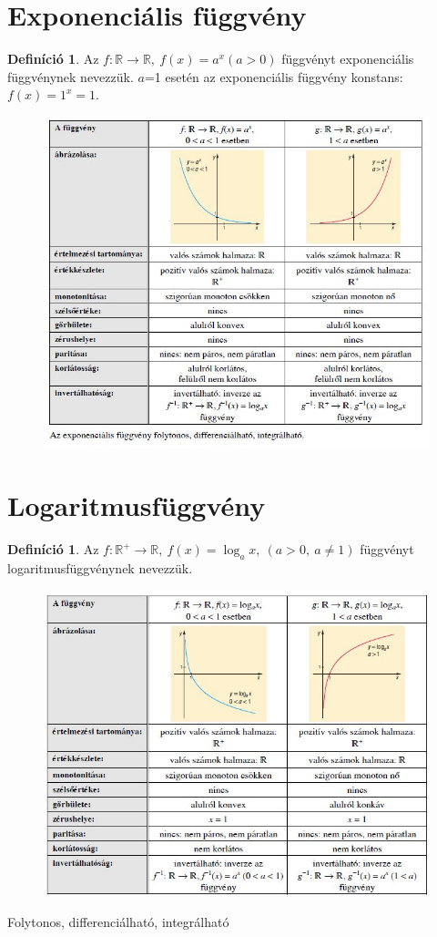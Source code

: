 \documentclass[twoside,12pt]{report}
\theoremstyle{definition}
\newtheorem{definition}[theorem]{Definíció}
\begin{document}
\section{Exponenciális függvény}
	\begin{definition}
		Az $f:\mathbb{R}\longrightarrow\mathbb{R},\ f(x)=a^x(a>0)$ függvényt exponenciális függvénynek nevezzük. $a$=1 esetén az exponenciális függvény konstans: $f(x)=1^x=1$.
	\end{definition}
	\begin{figure}[H]
		\centering
		\includegraphics[width=\linewidth]{Exp}
	\end{figure}
\section{Logaritmusfüggvény}
	\begin{definition}
		Az $f:\mathbb{R}^+\longrightarrow\mathbb{R},\ f(x)=\log_ax,\ (a>0,\ a\ne1)$ függvényt logaritmusfüggvénynek nevezzük.
	\end{definition}
	\begin{figure}[H]
		\centering
		\includegraphics[width=\linewidth]{LogFv.JPG}
	\end{figure}
	Folytonos, differenciálható, integrálható
\end{document}
